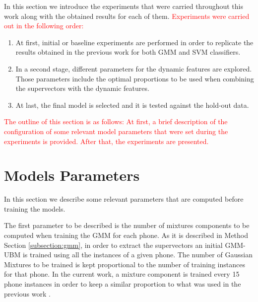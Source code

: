 
In this section we introduce the experiments that were carried throughout this work
along with the obtained results for each of them. \textcolor{red}{Experiments were carried
out in the following order:}

\begin{enumerate}
	\item At first, initial or baseline
	experiments are performed in order to replicate the results
	obtained in the previous work \cite{main} for both GMM and SVM classifiers.
	\item In a second stage, different parameters for the dynamic features are explored.
	Those parameters include the optimal proportions to be used when combining the
	supervectors with the dynamic features.
	\item At last, the final model is selected and it is tested against the hold-out data.
\end{enumerate}


\textcolor{red}{The outline of this section is as follows: At first, a brief description of the configuration
of some relevant model parameters that were set during the experiments is provided.
After that, the experiments are presented.}

\section{Models Parameters}

In this section we describe some relevant parameters that are computed before training the
models.

The first parameter to be described is the number of mixtures components
to be computed when training the GMM for each phone. As it is described in Method Section
\ref{subsection:gmm}, in order to extract the supervectors an initial GMM-UBM is trained
using all the instances of a given phone.
The number of Gaussian Mixtures to be trained is kept proportional to the number of
training instances for that phone. In the current work, a
mixture component is trained every 15 phone instances
in order to keep a similar proportion to what was used in the previous work \cite{main} .

